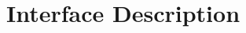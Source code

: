 \section{Interface Description}



\subsection{}



\subsection{}



\subsection{}



\subsection{}



\subsection{}



\subsection{}



\subsection{}




